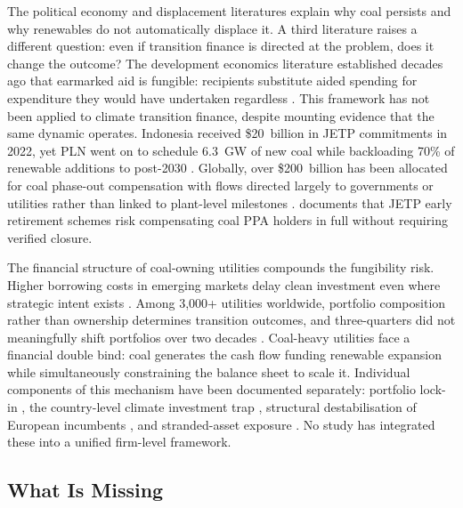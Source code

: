 \documentclass[review,3p,authoryear]{elsarticle}
\begin{document}
The political economy and displacement literatures explain why coal persists and why renewables do not automatically displace it. A third literature raises a different question: even if transition finance is directed at the problem, does it change the outcome? The development economics literature established decades ago that earmarked aid is fungible: recipients substitute aided spending for expenditure they would have undertaken regardless \citep{Feyzioglu1998,Devarajan2000}. This framework has not been applied to climate transition finance, despite mounting evidence that the same dynamic operates. Indonesia received \$20~billion in JETP commitments in 2022, yet PLN went on to schedule 6.3~GW of new coal while backloading 70\% of renewable additions to post-2030 \citep{Ashurst2025}. Globally, over \$200~billion has been allocated for coal phase-out compensation with flows directed largely to governments or utilities rather than linked to plant-level milestones \citep{Nacke2024}. \citet{Boute2025} documents that JETP early retirement schemes risk compensating coal PPA holders in full without requiring verified closure.

The financial structure of coal-owning utilities compounds the fungibility risk. Higher borrowing costs in emerging markets delay clean investment even where strategic intent exists \citep{Ameli2021}. Among 3,000+ utilities worldwide, portfolio composition rather than ownership determines transition outcomes, and three-quarters did not meaningfully shift portfolios over two decades \citep{Alova2020}. Coal-heavy utilities face a financial double bind: coal generates the cash flow funding renewable expansion while simultaneously constraining the balance sheet to scale it. Individual components of this mechanism have been documented separately: portfolio lock-in \citep{Alova2020}, the country-level climate investment trap \citep{Ameli2021}, structural destabilisation of European incumbents \citep{Kungl2018}, and stranded-asset exposure \citep{CarbonTracker2021}. No study has integrated these into a unified firm-level framework.

\subsection{What Is Missing}
\end{document}
